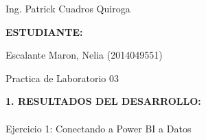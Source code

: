 \documentclass[12pt,letterpaper]{article}
\begin{document}
\begin{titlepage}
\begin{center}
\vspace*{0.1in}
\begin{large}
 Ing. Patrick Cuadros Quiroga\\
\end{large}

\vspace*{0.2in}
\vspace*{0.1in}
\begin{large}
\textbf{ESTUDIANTE:} \\
\vspace{\baselineskip}
\begin{flushleft}

Escalante Maron, Nelia 		\hfill	(2014049551) \\

\end{flushleft}
\end{large}
\end{center}

\end{titlepage}

\newpage

	\begin{center}
		\Large Practica de Laboratorio 03
	\end{center}
	\vspace{\baselineskip}
	\vspace{\baselineskip}
	\textbf{\Large 1. RESULTADOS DEL DESARROLLO:}
	\\\\
Ejercicio 1: Conectando a Power BI a Datos \\\\
\end{document}
